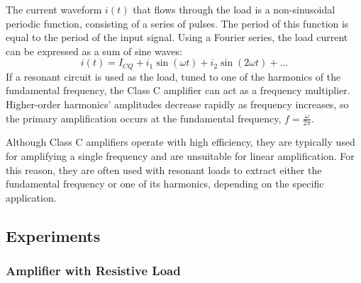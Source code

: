 \documentclass[12pt,a4paper]{article}
\begin{document}
    The current waveform \( i(t) \) that flows through the load is a non-sinusoidal periodic function, consisting of a series of pulses. The period of this function is equal to the period of the input signal. Using a Fourier series, the load current can be expressed as a sum of sine waves:
    \[
    i(t) = I_{CQ} + i_1 \sin(\omega t) + i_2 \sin(2 \omega t) + \dots
    \]
    If a resonant circuit is used as the load, tuned to one of the harmonics of the fundamental frequency, the Class C amplifier can act as a frequency multiplier. Higher-order harmonics' amplitudes decrease rapidly as frequency increases, so the primary amplification occurs at the fundamental frequency, \( f = \frac{\omega}{2 \pi} \).

    Although Class C amplifiers operate with high efficiency, they are typically used for amplifying a single frequency and are unsuitable for linear amplification. For this reason, they are often used with resonant loads to extract either the fundamental frequency or one of its harmonics, depending on the specific application.

    \subsection{Experiments}

    \subsubsection{Amplifier with Resistive Load}
\end{document}
